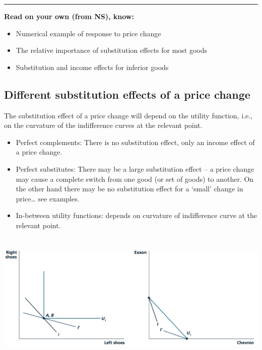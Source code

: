 \documentclass[]{article}
\providecommand{\tightlist}{%
  \setlength{\itemsep}{0pt}\setlength{\parskip}{0pt}}
\begin{document}
\begin{center}\rule{0.5\linewidth}{\linethickness}\end{center}

\textbf{Read on your own (from NS), know:}

\begin{itemize}
\tightlist
\item
  Numerical example of response to price change
\item
  The relative importance of substitution effects for most goods
\item
  Substitution and income effects for inferior goods
\end{itemize}

\hypertarget{different-substitution-effects-of-a-price-change}{%
\subsection{Different substitution effects of a price
change}\label{different-substitution-effects-of-a-price-change}}

The substitution effect of a price change will depend on the utility
function, i.e., on the curvature of the indifference curves at the
relevant point.

\begin{itemize}
\item
  Perfect complements: There is no substitution effect, only an income
  effect of a price change.
\item
  Perfect substitutes: There may be a large substitution effect -- a
  price change may cause a complete switch from one good (or set of
  goods) to another. On the other hand there may be no substitution
  effect for a `small' change in price\ldots{} see examples.
\item
  In-between utility functions: depends on curvature of indifference
  curve at the relevant point.
\end{itemize}

\includegraphics[height=2.5in]{picsfigs/substfxperfect_trim.png}
\end{document}
